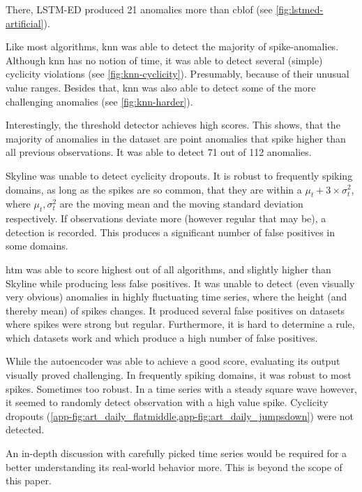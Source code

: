 \begin{description}[style=unboxed,leftmargin=0cm]
    There, LSTM-ED produced 21 anomalies more than \gls{cblof} (see \cref{fig:lstmed-artificial}).
    \item[kNN] Like most algorithms, \gls{knn} was able to detect the majority
    of spike-anomalies. Although \gls{knn} has no notion of time, it was able
    to detect several (simple) cyclicity violations (see \cref{fig:knn-cyclicity}). Presumably,
    because of their unusual value ranges. Besides that, \gls{knn} was also able
    to detect some of the more challenging anomalies (see \cref{fig:knn-harder}).
    \item[Threshold Detector] Interestingly, the threshold detector achieves high scores.
    This shows, that the majority of anomalies in the dataset are point anomalies 
    that spike higher than all previous observations. It was able to detect
    71 out of 112 anomalies.
    \item[Skyline] Skyline was unable to detect cyclicity dropouts. It is robust
    to frequently spiking domains, as long as the spikes are so common, that
    they are within a \(\mu_t + 3 \times \sigma_t^2\), where \(\mu_t, \sigma_t^2\) 
    are the moving mean and the moving standard deviation respectively. If observations
    deviate more (however regular that may be), a detection is recorded.
    This produces a significant number of false positives in some domains.
    \item[Numenta HTM] \gls{htm} was able to score highest out of all algorithms,
    and slightly higher than Skyline while producing less false positives. It
    was unable to detect (even visually very obvious) anomalies in highly
    fluctuating time series, where the height (and thereby mean) of spikes
    changes. It produced several false positives on datasets where spikes were
    strong but regular. Furthermore, it is hard to determine a rule, which datasets
    work and which produce a high number of false positives.

    \item[AutoEncoder] While the autoencoder was able to achieve a good score,
    evaluating its output visually proved challenging. In frequently spiking
    domains, it was robust to most spikes. Sometimes too robust. In a time series with a
    steady square wave however, it seemed to randomly detect observation with a
    high value spike. Cyclicity dropouts (\cref{app-fig:art_daily_flatmiddle,app-fig:art_daily_jumpsdown})
    were not detected.
    
    An in-depth discussion with carefully picked time series would be required for
    a better understanding its real-world behavior more. This is beyond the scope
    of this paper.
\end{description}



